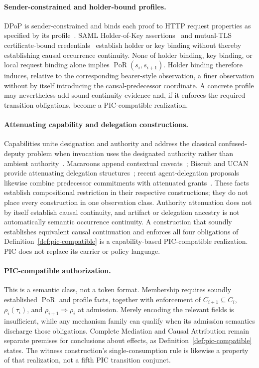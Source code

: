 \documentclass[10pt,twocolumn]{article}
\newcommand{\PoR}{\operatorname{PoR}}
\begin{document}
\paragraph{Sender-constrained and holder-bound profiles.}
DPoP is sender-constrained and binds each proof to HTTP request properties as
specified by its profile~\cite{rfc9449}. SAML Holder-of-Key
assertions~\cite{samlhok} and mutual-TLS certificate-bound
credentials~\cite{rfc8705} establish holder or key binding without thereby
establishing causal occurrence continuity. None of holder binding, key binding,
or local request binding alone implies \(\PoR(s_i,s_{i+1})\). Holder binding
therefore induces, relative to the corresponding bearer-style observation, a
finer observation without by itself introducing the causal-predecessor
coordinate. A concrete profile may nevertheless add sound continuity evidence
and, if it enforces the required transition obligations, become a
PIC-compatible realization.

\paragraph{Attenuating capability and delegation constructions.}
Capabilities unite designation and authority and address the classical
confused-deputy problem when invocation uses the designated authority rather
than ambient authority~\cite{dennis1966programming,miller2003capability}.
Macaroons append contextual caveats~\cite{birgisson2014macaroons}; Biscuit and
UCAN provide attenuating delegation structures~\cite{biscuitspec,ucanspec};
recent agent-delegation proposals likewise combine predecessor commitments
with attenuated grants~\cite{asor2026delegation,atakora2026sadp}. These facts
establish compositional restriction in their respective constructions; they do
not place every construction in one observation class. Authority attenuation
does not by itself establish causal continuity, and artifact or delegation
ancestry is not automatically semantic occurrence continuity. A construction
that soundly establishes equivalent causal continuation and enforces all four
obligations of Definition~\ref{def:pic-compatible} is a capability-based
PIC-compatible realization. PIC does not replace its carrier or policy
language.

\paragraph{PIC-compatible authorization.}
This is a semantic class, not a token format. Membership requires soundly
established \(\PoR\) and profile facts, together with enforcement of
\(C_{i+1}\subseteq C_i\), \(\rho_i(\tau_i)\), and
\(\rho_{i+1}\Rightarrow\rho_i\) at admission. Merely encoding the relevant
fields is insufficient, while any mechanism family can qualify when its
admission semantics discharge those obligations. Complete Mediation and
Causal Attribution remain separate premises for conclusions about effects, as
Definition~\ref{def:pic-compatible} states. The witness construction's
single-consumption rule is likewise a property of that realization, not a
fifth PIC transition conjunct.
\end{document}

